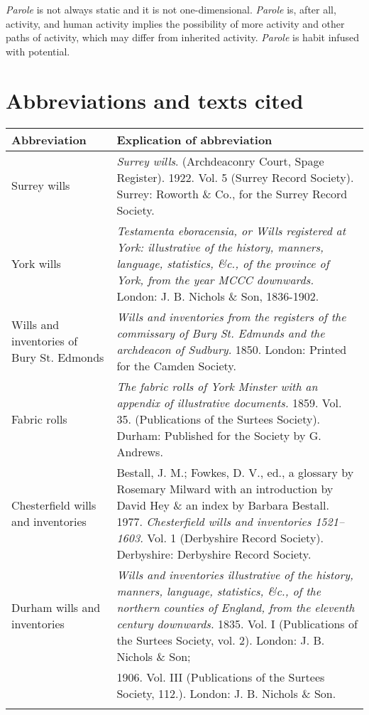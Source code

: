 \documentclass[output=paper,
modfonts
]{LSP/langsci}
\begin{document}
\emph{Parole} is not always static and it is not one-dimensional.
\emph{Parole} is, after all, activity, and human activity implies the
possibility of more activity and other paths of activity, which may
differ from inherited activity. \emph{Parole} is habit infused with
potential.

\nocite{XYORK,XYDURHAMI,XYDURHAMIII,XCHEST,XEDWARD,Xsurrey}
\section*{Abbreviations and texts cited}
\begin{tabular}{p{.2\linewidth}p{.73\linewidth}}
\lsptoprule
Abbreviation & Explication of abbreviation\\
\midrule
Surrey wills &\emph{Surrey wills}. (Archdeaconry Court, Spage Register). 1922. Vol. 5 (Surrey Record Society). Surrey:  Roworth \& Co., for the Surrey Record Society.\\
York wills &\emph{Testamenta eboracensia, or Wills registered at York: illustrative of the history, manners, language, statistics, \&c., of the province of York, from the year MCCC downwards.}  London:  J. B. Nichols \& Son, 1836-1902.\\
Wills and inventories of Bury St. Edmonds&\emph{Wills and inventories from the registers of the commissary of Bury St. Edmunds and the archdeacon of Sudbury.} 1850.   London:  Printed for the Camden Society.\\
Fabric rolls &\emph{The fabric rolls of York Minster with an appendix of illustrative documents.} 1859.  Vol. 35.  (Publications of the Surtees Society).  Durham: Published for the Society by G. Andrews.\\
Chesterfield wills and inventories  &Bestall, J. M.; Fowkes, D. V., ed., a glossary by Rosemary Milward with an introduction by David Hey \& an index by Barbara Bestall. 1977. \emph{Chesterfield wills and inventories 1521–1603.} Vol. 1 (Derbyshire Record Society).  Derbyshire:  Derbyshire Record Society.\\
Durham wills and inventories &\emph{Wills and inventories illustrative of the history, manners, language, statistics, \&c., of the northern counties of England, from the eleventh century downwards.} 1835.
Vol. I (Publications of the Surtees Society, vol. 2).  London: J. B. Nichols \& Son; \\
&  1906.  Vol. III  (Publications of the Surtees Society, 112.).  London:  J. B. Nichols \& Son.  \\
\lspbottomrule
\end{tabular}



\printbibliography[heading=subbibliography,notkeyword=this]
\end{document}
